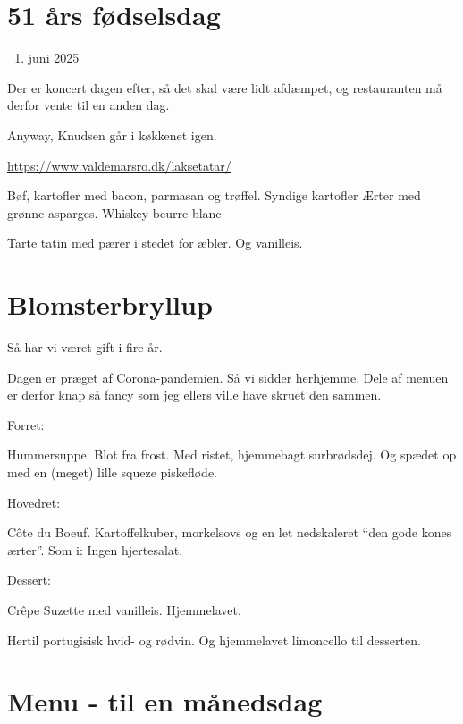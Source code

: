 \documentclass[
]{book}
\providecommand{\tightlist}{%
  \setlength{\itemsep}{0pt}\setlength{\parskip}{0pt}}
\begin{document}
\hypertarget{uxe5rs-fuxf8dselsdag}{%
\section{51 års fødselsdag}\label{uxe5rs-fuxf8dselsdag}}

\begin{enumerate}
\def\labelenumi{\arabic{enumi}.}
\setcounter{enumi}{19}
\tightlist
\item
  juni 2025
\end{enumerate}

Der er koncert dagen efter, så det skal være lidt afdæmpet, og restauranten må derfor vente til en anden dag.

Anyway, Knudsen går i køkkenet igen.

\url{https://www.valdemarsro.dk/laksetatar/}

Bøf, kartofler med bacon, parmasan og trøffel. Syndige kartofler
Ærter med grønne asparges.
Whiskey beurre blanc

Tarte tatin med pærer i stedet for æbler.
Og vanilleis.

\hypertarget{blomsterbryllup}{%
\section{Blomsterbryllup}\label{blomsterbryllup}}

Så har vi været gift i fire år.

Dagen er præget af Corona-pandemien. Så vi sidder herhjemme. Dele af menuen er derfor knap så fancy som jeg ellers ville have skruet den sammen.

Forret:

Hummersuppe. Blot fra frost. Med ristet, hjemmebagt surbrødsdej. Og spædet op med en (meget) lille squeze piskefløde.

Hovedret:

Côte du Boeuf. Kartoffelkuber, morkelsovs og en let nedskaleret ``den gode kones ærter''. Som i: Ingen hjertesalat.

Dessert:

Crêpe Suzette med vanilleis. Hjemmelavet.

Hertil portugisisk hvid- og rødvin. Og hjemmelavet limoncello til desserten.

\hypertarget{menu---til-en-muxe5nedsdag}{%
\section{Menu - til en månedsdag}\label{menu---til-en-muxe5nedsdag}}
\end{document}
